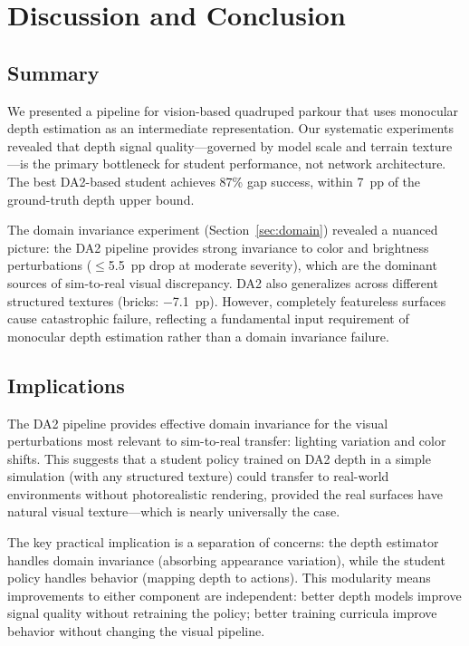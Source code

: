 \documentclass[10pt,twocolumn]{article}
\begin{document}
\section{Discussion and Conclusion}
\label{sec:conclusion}

\subsection{Summary}

We presented a pipeline for vision-based quadruped parkour that uses
monocular depth estimation as an intermediate representation.  Our
systematic experiments revealed that depth signal quality---governed
by model scale and terrain texture---is the primary bottleneck for
student performance, not network architecture.  The best DA2-based
student achieves 87\% gap success, within 7~pp of the ground-truth
depth upper bound.

The domain invariance experiment (Section~\ref{sec:domain}) revealed
a nuanced picture: the DA2 pipeline provides strong invariance to
color and brightness perturbations ($\leq$5.5~pp drop at moderate
severity), which are the dominant sources of sim-to-real visual
discrepancy.  DA2 also generalizes across different structured textures
(bricks: $-$7.1~pp).  However, completely featureless surfaces cause
catastrophic failure, reflecting a fundamental input requirement of
monocular depth estimation rather than a domain invariance failure.

\subsection{Implications}

The DA2 pipeline provides effective domain invariance for the visual
perturbations most relevant to sim-to-real transfer: lighting
variation and color shifts.  This suggests that a student policy
trained on DA2 depth in a simple simulation (with any structured
texture) could transfer to real-world environments without
photorealistic rendering, provided the real surfaces have natural
visual texture---which is nearly universally the case.

The key practical implication is a separation of concerns:
the depth estimator handles domain invariance (absorbing
appearance variation), while the student policy handles
behavior (mapping depth to actions).  This modularity means
improvements to either component are independent: better depth
models improve signal quality without retraining the policy;
better training curricula improve behavior without changing
the visual pipeline.
\end{document}
